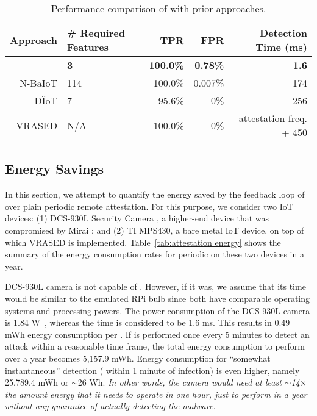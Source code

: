 \begin{table}[t!]
	\scriptsize
	\centering
        \caption{Performance comparison of \system{} with prior approaches.}
	\begin{tabularx}{\linewidth}
{r p{15mm} r r r}
  \toprule
  \textbf{Approach} & \textbf{\# Required Features} & \textbf{TPR} & \textbf{FPR} & \textbf{Detection Time (ms)} \\
  \midrule
  \textbf{\system{}} & \textbf{3} & \textbf{100.0\%} & \textbf{0.78\%} & \textbf{1.6}\\
  N-BaIoT \cite{meidan2018n} & 114 & 100.0\% & 0.007\% & 174 \\
  D\"IoT \cite{nguyen2019diot} & 7 & 95.6\% & 0\% & 256 \\
  VRASED \cite{vrasedp} & N/A & 100.0\% & 0\% & attestation freq. + 450\\
  \bottomrule
\end{tabularx}
\vspace{-1em}
\label{tab:performance comparison}
\end{table}

\subsection{Energy Savings}
\label{subsec: energy-savings}
In this section, we attempt to quantify the energy saved by the feedback loop of \system{} over plain periodic remote attestation. For this purpose, we consider two IoT devices: (1) DCS-930L Security Camera \cite{DCS-930L}, a higher-end device that was compromised by Mirai \cite{nguyen2019diot}; and (2) TI MPS430, a bare metal IoT device, on top of which VRASED is implemented. Table~\ref{tab:attestation energy} shows the summary of the energy consumption rates for periodic \ra{} on these two devices in a year.

DCS-930L camera is not capable of \ra{}. However, if it was, we assume that its \ra{} time would be similar to the emulated RPi bulb since both have comparable operating systems and processing powers. The power consumption of the DCS-930L camera is 1.84 W~\cite{DCS-930L-specs}, whereas the \ra{} time is considered to be 1.6 ms. This results in 0.49 mWh energy consumption per \ra{}. If \ra{} is performed once every 5 minutes to detect an attack within a reasonable time frame, the total energy consumption to perform \ra{} over a year becomes 5,157.9 mWh. Energy consumption for ``somewhat instantaneous'' detection (\ie{} within 1 minute of infection) is even higher, namely 25,789.4 mWh or $\sim$26 Wh. \textit{In other words, the camera would need at least $\sim$14$\times$ the amount energy that it needs to operate in one hour, just to perform \ra{} in a year without any guarantee of \textit{actually} detecting the malware.}

